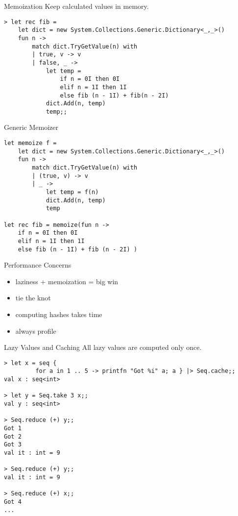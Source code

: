 \documentclass{beamer}
\begin{document}
\begin{frame}[fragile]{Memoization}
  Keep calculated values in memory.
  \small
  \begin{verbatim}
> let rec fib =
    let dict = new System.Collections.Generic.Dictionary<_,_>()
    fun n ->
        match dict.TryGetValue(n) with
        | true, v -> v
        | false, _ -> 
            let temp =
                if n = 0I then 0I
                elif n = 1I then 1I
                else fib (n - 1I) + fib(n - 2I)
            dict.Add(n, temp)
            temp;;
  \end{verbatim}
\end{frame}

\begin{frame}[fragile]{Generic Memoizer}
\small
  \begin{verbatim}
let memoize f =
    let dict = new System.Collections.Generic.Dictionary<_,_>()
    fun n ->
        match dict.TryGetValue(n) with
        | (true, v) -> v
        | _ ->
            let temp = f(n)
            dict.Add(n, temp)
            temp
 
let rec fib = memoize(fun n ->
    if n = 0I then 0I
    elif n = 1I then 1I
    else fib (n - 1I) + fib (n - 2I) )
  \end{verbatim}
\end{frame}

\begin{frame}{Performance Concerns}
  \begin{itemize}[<+->]
    \item laziness + memoization = big win
    \item tie the knot
    \item computing hashes takes time
    \item always profile
  \end{itemize}
\end{frame}

\begin{frame}[fragile]{Lazy Values and Caching}
  All lazy values are computed only once.
\small
  \begin{verbatim}
> let x = seq {
         for a in 1 .. 5 -> printfn "Got %i" a; a } |> Seq.cache;;
val x : seq<int>

> let y = Seq.take 3 x;;
val y : seq<int>

> Seq.reduce (+) y;;
Got 1
Got 2
Got 3
val it : int = 9

> Seq.reduce (+) y;;
val it : int = 9

> Seq.reduce (+) x;;
Got 4
...
  \end{verbatim}
\end{frame}
\end{document}
